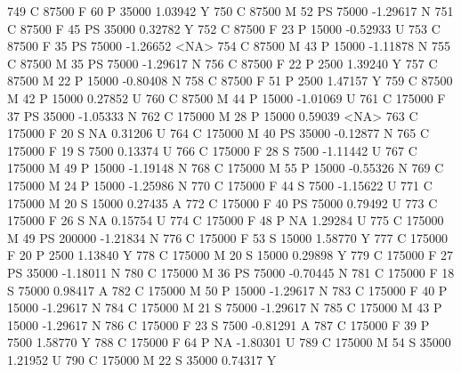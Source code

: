 \documentclass{article}
\begin{document}
\begin{Schunk}
\begin{Soutput}
749       C      87500   F  60         P  35000   1.03942    Y
750       C      87500   M  52        PS  75000  -1.29617    N
751       C      87500   F  45        PS  35000   0.32782    Y
752       C      87500   F  23         P  15000  -0.52933    U
753       C      87500   F  35        PS  75000  -1.26652 <NA>
754       C      87500   M  43         P  15000  -1.11878    N
755       C      87500   M  35        PS  75000  -1.29617    N
756       C      87500   F  22         P   2500   1.39240    Y
757       C      87500   M  22         P  15000  -0.80408    N
758       C      87500   F  51         P   2500   1.47157    Y
759       C      87500   M  42         P  15000   0.27852    U
760       C      87500   M  44         P  15000  -1.01069    U
761       C     175000   F  37        PS  35000  -1.05333    N
762       C     175000   M  28         P  15000   0.59039 <NA>
763       C     175000   F  20         S     NA   0.31206    U
764       C     175000   M  40        PS  35000  -0.12877    N
765       C     175000   F  19         S   7500   0.13374    U
766       C     175000   F  28         S   7500  -1.11442    U
767       C     175000   M  49         P  15000  -1.19148    N
768       C     175000   M  55         P  15000  -0.55326    N
769       C     175000   M  24         P  15000  -1.25986    N
770       C     175000   F  44         S   7500  -1.15622    U
771       C     175000   M  20         S  15000   0.27435    A
772       C     175000   F  40        PS  75000   0.79492    U
773       C     175000   F  26         S     NA   0.15754    U
774       C     175000   F  48         P     NA   1.29284    U
775       C     175000   M  49        PS 200000  -1.21834    N
776       C     175000   F  53         S  15000   1.58770    Y
777       C     175000   F  20         P   2500   1.13840    Y
778       C     175000   M  20         S  15000   0.29898    Y
779       C     175000   F  27        PS  35000  -1.18011    N
780       C     175000   M  36        PS  75000  -0.70445    N
781       C     175000   F  18         S  75000   0.98417    A
782       C     175000   M  50         P  15000  -1.29617    N
783       C     175000   F  40         P  15000  -1.29617    N
784       C     175000   M  21         S  75000  -1.29617    N
785       C     175000   M  43         P  15000  -1.29617    N
786       C     175000   F  23         S   7500  -0.81291    A
787       C     175000   F  39         P   7500   1.58770    Y
788       C     175000   F  64         P     NA  -1.80301    U
789       C     175000   M  54         S  35000   1.21952    U
790       C     175000   M  22         S  35000   0.74317    Y

\end{Soutput}
\end{Schunk}
\end{document}
